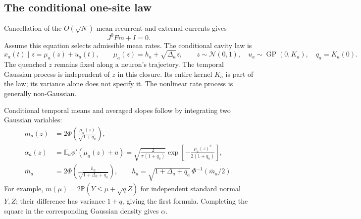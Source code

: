 \subsection{The conditional one-site law}

Cancellation of the $O(\sqrt N)$ mean recurrent and external currents gives
\begin{equation}
 J^0F\overline m+I=0.
 \label{eq:an_balance}
\end{equation}
Assume this equation selects admissible mean rates. The conditional cavity law
is
\begin{equation}
 x_a(t)\mid z=\mu_a(z)+u_a(t),\qquad
 \mu_a(z)=h_a+\sqrt{\Delta_a}z,\qquad
 z\sim\mathcal N(0,1),\quad
 u_a\sim\operatorname{GP}(0,K_a),\quad q_a=K_a(0).
 \label{eq:an_site}
\end{equation}
The quenched $z$ remains fixed along a neuron's trajectory. The temporal
Gaussian process is independent of $z$ in this closure. Its entire kernel
$K_a$ is part of the law; its variance alone does not specify it. The
nonlinear rate process is generally non-Gaussian.

Conditional temporal means and averaged slopes follow by integrating two
Gaussian variables:
\begin{align}
 m_a(z)&=2\Phi\!\left(\frac{\mu_a(z)}{\sqrt{1+q_a}}\right),\\
 \alpha_a(z)&=\mathbb E_u\phi'(\mu_a(z)+u)
 =\sqrt{\frac2{\pi(1+q_a)}}
   \exp\!\left[-\frac{\mu_a(z)^2}{2(1+q_a)}\right],\\
 \overline m_a&=2\Phi\!\left(\frac{h_a}{\sqrt{1+\Delta_a+q_a}}\right),
 \qquad
 h_a=\sqrt{1+\Delta_a+q_a}\,
       \Phi^{-1}(\overline m_a/2).
 \label{eq:an_site_closed}
\end{align}
For example, $m(\mu)=2\mathbb P(Y\leq\mu+\sqrt q Z)$ for independent standard
normal $Y,Z$; their difference has variance $1+q$, giving the first formula.
Completing the square in the corresponding Gaussian density gives $\alpha$.

